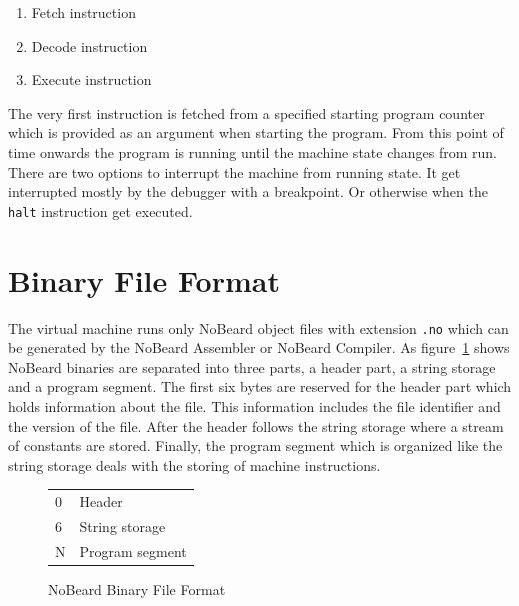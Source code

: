 \begin{enumerate}
\item Fetch instruction
\item Decode instruction
\item Execute instruction
\end{enumerate}

The very first instruction is fetched from a specified starting program counter which is provided as an argument when starting the program. From this point of time onwards the program is running until the machine state changes from run. There are two options to interrupt the machine from running state.  It get interrupted mostly by the debugger with a breakpoint. Or otherwise when the \lstinline$halt$ instruction get executed.

\section{Binary File Format}
The virtual machine runs only NoBeard object files with extension \lstinline$.no$ which can be generated by the NoBeard Assembler or NoBeard Compiler. As figure~\ref{fig:binaryfileformat} shows NoBeard binaries are separated into three parts, a header part, a string storage and a program segment.
The first six bytes are reserved for the header part which holds information about the file. This information includes the file identifier and the version of the file. After the header follows the string storage where a stream of constants are stored. Finally, the program segment which is organized like the string storage deals with the storing of machine instructions. 
\begin{figure}[h]
\begin{center}
\begin{tabular}{p{1em}|p{10em}|}
\cline{2-2}
\parbox[c][3em][t]{1em}{\hfill 0} & Header \\ 
\parbox[c][4em][t]{1em}{\hfill 6} & String storage \\ 
\parbox[c][5em][b]{1em}{\hfill N} & Program segment \\ 
\end{tabular}
\end{center}
\caption{NoBeard Binary File Format}\label{fig:binaryfileformat}
\end{figure}

